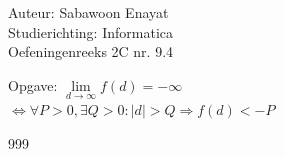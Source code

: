 \documentclass[a4paper]{article}
\begin{document}
  
\noindent \large Auteur: Sabawoon Enayat      \\
\noindent \large Studierichting: Informatica  \\
\noindent \large Oefeningenreeks 2C nr. 9.4 \\

\newcommand{\llim}{\lim\limits}

\medskip

\normalsize

Opgave: $\llim_{d \to \infty} f(d) = -\infty$\\

$\Leftrightarrow \forall P > 0, \exists Q > 0: |d| > Q \Rightarrow f(d) < -P$\\

\begin{thebibliography}{999}
\end{thebibliography}
\end{document}
